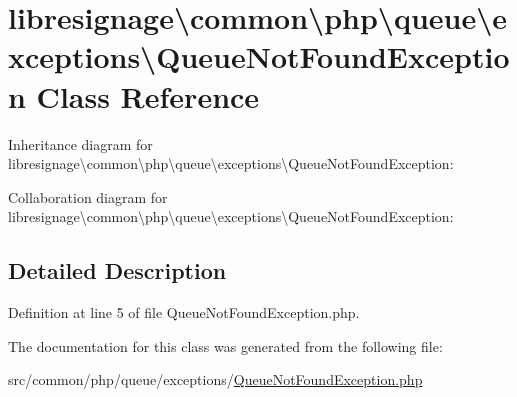 \hypertarget{classlibresignage_1_1common_1_1php_1_1queue_1_1exceptions_1_1QueueNotFoundException}{}\section{libresignage\textbackslash{}common\textbackslash{}php\textbackslash{}queue\textbackslash{}exceptions\textbackslash{}Queue\+Not\+Found\+Exception Class Reference}
\label{classlibresignage_1_1common_1_1php_1_1queue_1_1exceptions_1_1QueueNotFoundException}


Inheritance diagram for libresignage\textbackslash{}common\textbackslash{}php\textbackslash{}queue\textbackslash{}exceptions\textbackslash{}Queue\+Not\+Found\+Exception\+:


Collaboration diagram for libresignage\textbackslash{}common\textbackslash{}php\textbackslash{}queue\textbackslash{}exceptions\textbackslash{}Queue\+Not\+Found\+Exception\+:


\subsection{Detailed Description}


Definition at line 5 of file Queue\+Not\+Found\+Exception.\+php.



The documentation for this class was generated from the following file\+:\begin{DoxyCompactItemize}
\item 
src/common/php/queue/exceptions/\hyperlink{QueueNotFoundException_8php}{Queue\+Not\+Found\+Exception.\+php}\end{DoxyCompactItemize}
